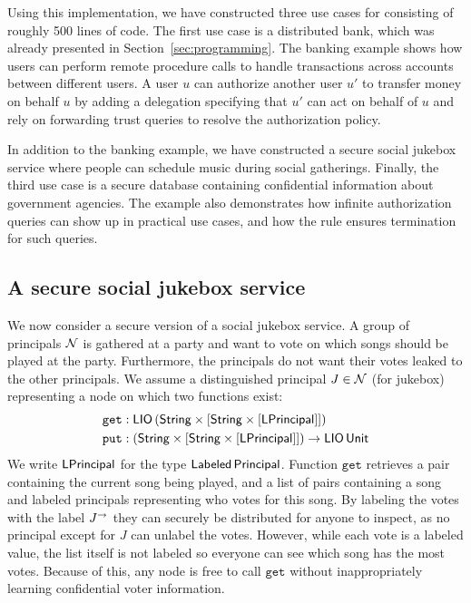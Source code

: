 Using this implementation, we have constructed three use cases for \lang{} consisting of roughly 500 lines of code. The first use case is a distributed bank, which was already presented in Section~\ref{sec:programming}. The banking example shows how users can perform remote procedure calls to handle transactions across accounts between different users. A user $u$ can authorize another user $u'$ to transfer money on behalf $u$ by adding a delegation specifying that $u'$ can act on behalf of $u$ and rely on forwarding trust queries to resolve the authorization policy.

In addition to the banking example, we have constructed a secure social jukebox service where people can schedule music during social gatherings. Finally, the third use case is a secure database containing confidential information about government agencies. The example also demonstrates how infinite authorization queries can show up in practical use cases, and how the  rule ensures termination for such queries.

\subsection{A secure social jukebox service}\label{subsec:jukebox}
We now consider a secure version of a social jukebox service. A group of principals $\mathcal{N}$ is gathered at a party and want to vote on which songs should be played at the party. Furthermore, the principals do not want their votes leaked to the other principals. We assume a distinguished principal $J \in \mathcal{N}$ (for jukebox) representing a node on which two functions exist:
\begin{align*}
\mathtt{get}&: \mathsf{LIO}\,(\mathsf{String} \times \lbrack\mathsf{String} \times \lbrack\mathsf{LPrincipal}\rbrack\rbrack)\\
\mathtt{put}&: (\mathsf{String} \times \lbrack\mathsf{String} \times \lbrack\mathsf{LPrincipal}\rbrack\rbrack) \to \mathsf{LIO}\,\mathsf{Unit}
\end{align*}
We write $\mathsf{LPrincipal}$ for the type $\mathsf{Labeled}\,\mathsf{Principal}$. Function $\mathtt{get}$ retrieves a pair containing the current song being played, and a list of pairs containing a song and labeled principals representing who votes for this song. By labeling the votes with the label $J^{\rightarrow}$ they can securely be distributed for anyone to inspect, as no principal except for $J$ can unlabel the votes. However, while each vote is a labeled value, the list itself is not labeled so everyone can see which song has the most votes. Because of this, any node is free to call $\mathtt{get}$ without inappropriately learning confidential voter information.

